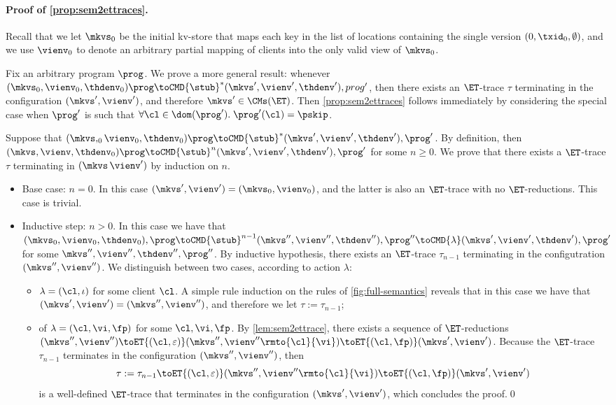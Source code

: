 \paragraph{Proof of \cref{prop:sem2ettraces}.} 
Recall that we let $\mkvs_{0}$ be the initial kv-store that maps 
each key in the list of locations containing the single version $(0, \txid_{0}, \emptyset)$, 
and we use $\vienv_{0}$ to denote an arbitrary partial mapping of clients into the only valid view 
of $\mkvs_{0}$.

Fix an arbitrary program $\prog$. We prove a more general result: 
whenever $(\mkvs_{0}, \vienv_{0}, \thdenv_{0}) \prog \toCMD{\stub}^{\ast} (\mkvs', \vienv', \thdenv'), prog'$, 
then there exists an $\ET$-trace $\tau$ terminating in the configuration $(\mkvs', \vienv')$, 
and therefore $\mkvs' \in \CMs(\ET)$.
Then \cref{prop:sem2ettraces} follows immediately by considering the 
special case when $\prog'$ is such that $\forall \cl \in \dom(\prog').\; \prog'(\cl) = \pskip$.

Suppose that $(\mkvs,_{0} \vienv_{0}, \thdenv_{0}) \prog \toCMD{\stub}^{\ast} (\mkvs', \vienv', \thdenv'), \prog'$. 
By definition, then $(\mkvs, \vienv, \thdenv_{0}) \prog \toCMD{\stub}^{n} (\mkvs', \vienv', \thdenv'), \prog'$ 
for some $n \geq 0$. We prove that there exists a $\ET$-trace $\tau$ terminating in $(\mkvs\, \vienv')$ 
by induction on $n$. 
\begin{itemize}
\item Base case: $n = 0$. In this case $(\mkvs', \vienv') = (\mkvs_{0}, \vienv_{0})$, and the latter 
is also an $\ET$-trace with no $\ET$-reductions. This case is trivial. 
\item Inductive step: $n > 0$. In this case we have that $(\mkvs_{0}, \vienv_{0}, \thdenv_{0}), \prog \toCMD{\stub}^{n-1} (\mkvs'', \vienv'', \thdenv''), \prog''
\toCMD{\lambda} (\mkvs', \vienv', \thdenv'), \prog'$ for some $\mkvs'', \vienv'', \thdenv'',\prog''$. By inductive hypothesis, 
there exists an $\ET$-trace $\tau_{n-1}$ terminating in the configutration $(\mkvs'', \vienv'')$. 
We distinguish between two cases, according to action $\lambda$: 
\begin{itemize}
\item $\lambda = (\cl, \iota)$ for some client $\cl$. A simple rule induction on the rules of \cref{fig:full-semantics} 
reveals that in this case we have that $(\mkvs', \vienv') = (\mkvs'', \vienv'')$, and therefore we let $\tau := \tau_{n-1}$; 
\item of $\lambda = (\cl, \vi, \fp)$ for some $\cl, \vi, \fp$. By \cref{lem:sem2ettrace}, there exists a sequence 
of $\ET$-reductions $(\mkvs'', \vienv'') \toET{(\cl, \varepsilon)} (\mkvs'', \vienv''\rmto{\cl}{\vi}) \toET{(\cl, \fp)} (\mkvs', \vienv')$. 
Because the $\ET$-trace $\tau_{n-1}$ terminates in the configuration $(\mkvs'', \vienv'')$, then
\[
\tau := \tau_{n-1} \toET{(\cl, \varepsilon)} (\mkvs'', \vienv''\rmto{\cl}{\vi}) \toET{(\cl, \fp)} (\mkvs', \vienv')
\]
is a well-defined $\ET$-trace that terminates in the configuration $(\mkvs', \vienv')$, which concludes the proof.\hfil\qed
\end{itemize}
\end{itemize}

